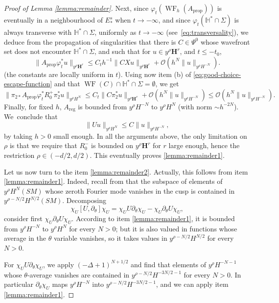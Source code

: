 \documentclass[JEP,XML,SOM,Unicode,NoFloatCountersInSection]{cedram}
\newcommand{\bH}{\boldsymbol{H}}
\newcommand{\HH}{\mathbb{H}}
\DeclareMathOperator{\WF}{WF}
\theoremstyle{plain}
\theoremstyle{definition}
\begin{document}
\begin{proof}[Proof of Lemma \ref{lemma:remainder}]
Next, since $\varphi_t(\WF_h(A_\mathrm{prop}))$ is eventually in a neighbourhood of $E^s_*$ when $t\to -\infty$, and since $\varphi_{t}(\HH^\ast\cap\Sigma)$ is always transverse with $\HH^\ast \cap \Sigma$, uniformly as $t\to -\infty$ (see~\eqref{eq:transversality}), we deduce from the propagation of singularities \cite[Prop.\,A.21 \& A.23]{Bonthonneau-Weich-17} that there is $C\in \Psi^0$ whose wavefront set does not encounter $\HH^\ast \cap \Sigma$, and such that for $u \in y^\rho \bH^r$, and $t\leq - t_0$,
\[
\| A_\mathrm{prop} \varphi_t^\ast u \|_{y^\rho \bH^r} \leq C_t h^{-1} \| C X u \|_{y^\rho \bH^r} + \mathcal{O}(h^N \| u \|_{y^\rho H^{-N}}).
\]
(the constants are locally uniform in $t$). Using now item (b) of \eqref{eq:good-choice-escape-function} and that $\WF(C)\cap\mathbb{H}^\ast \cap \Sigma= \emptyset$, we get
\[
\| \pi_{2\ast} A_\mathrm{prop} \varphi_t^\ast R_0^+ \pi_2^\ast u \|_{y^\rho H^{N}} \leq C_t \| C \pi_2^\ast u \|_{y^\rho \bH^r} + \mathcal{O}(h^N \| u \|_{y^\rho H^{-N}}) \leq \mathcal{O}(h^N \| u\|_{y^\rho H^{-N}}).
\]
Finally, for fixed $h$, $A_\mathrm{reg}$ is bounded from $y^\rho H^{-N}$ to $y^\rho H^{N}$ (with norm $\sim h^{-2N}$). We~conclude that
\[
\| U u \|_{y^\rho H^{N}} \leq C \| u \|_{y^\rho H^{-N}},
\]
by taking $h>0$ small enough. In all the arguments above, the only limitation on $\rho$ is that we require that $R_0^-$ is bounded on $y^\rho \bH^r$ for $r$ large enough, hence the restriction $\rho \in (-d/2, d/2)$. This eventually proves \eqref{lemma:remainder1}.

Let us now turn to the item \eqref{lemma:remainder2}. Actually, this follows from item \eqref{lemma:remainder1}. Indeed, recall from \cite[Lem.\,4.3]{Bonthonneau-Lefeuvre-19-1} that the subspace of elements of $y^{\rho}H^N(SM)$ whose zeroth Fourier mode vanishes in the cusp is contained in $y^{\rho-N/2} H^{N/2}(SM)$. Decomposing
\[
\chi_U [U,\partial_\theta]\chi_U= \chi_U U\partial_\theta \chi_U - \chi_U \partial_\theta U \chi_U,
\]
consider first $\chi_U\partial_\theta U\chi_U$. According to item \eqref{lemma:remainder1}, it is bounded from $y^\rho H^{-N}$ to $y^\rho H^N$ for every $N>0$; but it is also valued in functions whose average in the $\theta$ variable vanishes, so it takes values in $y^{\rho-N/2} H^{N/2}$ for every $N>0$.

For $\chi_U U\partial_\theta \chi_U$, we apply $(-\Delta+1)^{N+1/2}$ and find that elements of $y^{\rho} H^{-N-1}$ whose $\theta$-average vanishes are contained in $y^{\rho-N/2} H^{-3N/2-1}$ for every $N>0$. In particular $\partial_\theta \chi_U$ maps $y^\rho H^{-N}$ into $y^{\rho-N/2} H^{-3N/2-1}$, and we can apply item \eqref{lemma:remainder1}.


\end{proof}
\end{document}
